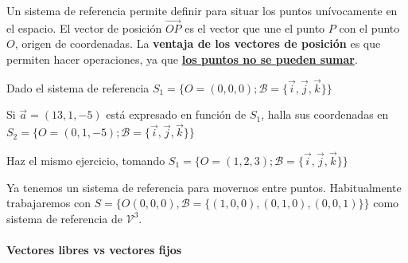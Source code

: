 Un sistema de referencia permite definir  para situar los puntos unívocamente en el espacio.
%
El vector de posición $\vec{OP}$ es el vector que une el punto $P$ con el punto $O$, origen de coordenadas. 
%
La \textbf{ventaja de los vectores de posición} es que permiten hacer operaciones, ya que \ul{\textbf{los puntos no se pueden sumar}}.



\begin{problem}

Dado el sistema de referencia $S_1=\{O = (0,0,0); \mathcal{B} = \{\vec{i},\vec{j},\vec{k}\}\}$

\ppart Si $\vec{a} = (13,1,-5)$ está expresado en función de $S_1$, halla sus coordenadas en $S_2=\{O = (0,1,-5); \mathcal{B} = \{\vec{i},\vec{j},\vec{k}\}\}$

\ppart Haz el mismo ejercicio, tomando $S_1=\{O = (1,2,3); \mathcal{B} = \{\vec{i},\vec{j},\vec{k}\}\}$

\solution
{}


\end{problem}


\obs Ya tenemos un sistema de referencia para movernos entre puntos. 
%
Habitualmente trabajaremos con $S= \{O(0,0,0), \mathcal{B} = \{(1,0,0), (0,1,0), (0,0,1)\}\}$ como sistema de referencia de $\mathcal{V}^3$.



\paragraph{Vectores libres vs vectores fijos}

